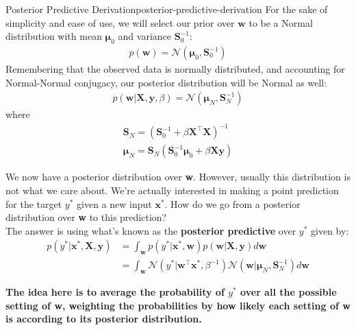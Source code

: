 \begin{derivation}{Posterior Predictive Derivation}{posterior-predictive-derivation}
    For the sake of simplicity and ease of use, we will select our prior over $\textbf{w}$ to be a Normal distribution with mean $\boldsymbol{\mu}_{0}$ and variance $\boldsymbol{S}_{0}^{-1}$:
    \begin{align*}
        p(\textbf{w}) = \mathcal{N}(\boldsymbol{\mu}_{0}, \boldsymbol{S}_{0}^{-1})
    \end{align*}
    Remembering that the observed data is normally distributed, and accounting for Normal-Normal conjugacy, our posterior distribution will be Normal as well:
    \begin{align*}
        p(\textbf{w}|\textbf{X},\textbf{y}, \beta) = \mathcal{N}(\boldsymbol{\mu}_{N}, \boldsymbol{S}_{N}^{-1})
    \end{align*}
    where
    \begin{align*}
        \boldsymbol{S}_{N} = (\boldsymbol{S}_{0}^{-1} + \beta\textbf{X}^\top\textbf{X})^{-1} \\
        \boldsymbol{\mu}_{N} = \boldsymbol{S}_{N}(\boldsymbol{S}_{0}^{-1}\boldsymbol{\mu}_{0} + \beta\textbf{X}\textbf{y})
    \end{align*}

    We now have a posterior distribution over \textbf{w}. However, usually this distribution is not what we care about. We're actually interested in making a point prediction for the target $y^{*}$ given a new input $\textbf{x}^{*}$. How do we go from a posterior distribution over \textbf{w} to this prediction? \\

    The answer is using what's known as the \textbf{posterior predictive} over $y^{*}$ given by:
    \begin{equation}
    \begin{split}
        p(y^{*} | \textbf{x}^{*}, \textbf{X}, \textbf{y}) &= \int_{\textbf{w}} p(y^{*} | \textbf{x}^{*}, \textbf{w})p(\textbf{w} | \textbf{X}, \textbf{y})d\textbf{w} \\
        &= \int_{\textbf{w}} \mathcal{N}(y^{*} | \textbf{w}^\top\textbf{x}^{*}, \beta^{-1})\mathcal{N}(\textbf{w} | \boldsymbol{\mu}_{N}, \boldsymbol{S}_{N}^{-1})d\textbf{w}
    \end{split}
    \end{equation}
\end{derivation}

\textbf{The idea here is to average the probability of $y^{*}$ over all the possible setting of \textbf{w}, weighting the probabilities by how likely each setting of \textbf{w} is according to its posterior distribution.}

